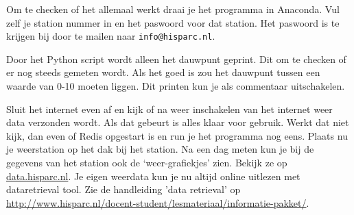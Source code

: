 Om te checken of het allemaal werkt draai je het programma in Anaconda. Vul zelf
je \hisparc station nummer in en het paswoord voor dat station. Het paswoord is te krijgen
bij \hisparc door te mailen naar \verb|info@hisparc.nl|.


Door het Python script wordt alleen het dauwpunt geprint. Dit om te checken
of er nog steeds gemeten wordt. Als het goed is zou het dauwpunt tussen
een waarde van 0-10 moeten liggen. Dit printen kun je als commentaar uitschakelen.

Sluit het internet even af en kijk of na weer inschakelen van het internet weer
data verzonden wordt. Als dat gebeurt is alles klaar voor gebruik.
Werkt dat niet kijk, dan even of Redis opgestart is en run je het programma
nog eens.
Plaats nu je weerstation op het dak bij het station. Na een dag meten kun je
bij de gegevens van het station ook de `weer-grafiekjes' zien. Bekijk ze op
\url{data.hisparc.nl}.
Je eigen weerdata kun je nu altijd online uitlezen met dataretrieval tool. Zie de handleiding
'data retrieval' op \url{http://www.hisparc.nl/docent-student/lesmateriaal/informatie-pakket/}.







